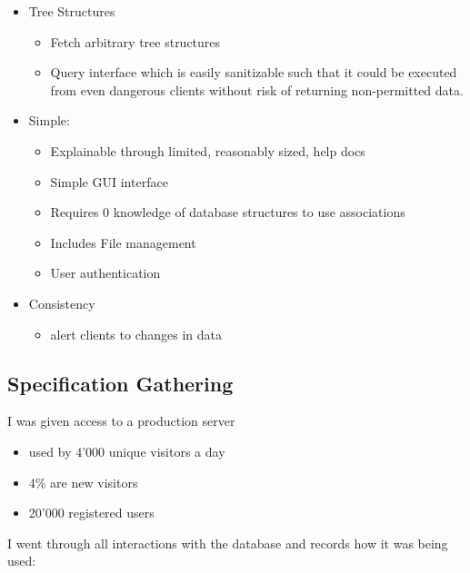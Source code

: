 \documentclass[
  12pt,
]{article}
\providecommand{\tightlist}{%
  \setlength{\itemsep}{0pt}\setlength{\parskip}{0pt}}
\begin{document}
\begin{itemize}
\tightlist
\item
  Tree Structures

  \begin{itemize}
  \tightlist
  \item
    Fetch arbitrary tree structures
  \item
    Query interface which is easily sanitizable such that it could be
    executed from even dangerous clients without risk of returning
    non-permitted data.
  \end{itemize}
\item
  Simple:

  \begin{itemize}
  \tightlist
  \item
    Explainable through limited, reasonably sized, help docs
  \item
    Simple GUI interface
  \item
    Requires 0 knowledge of database structures to use associations
  \item
    Includes File management
  \item
    User authentication
  \end{itemize}
\item
  Consistency

  \begin{itemize}
  \tightlist
  \item
    alert clients to changes in data
  \end{itemize}
\end{itemize}

\hypertarget{specification-gathering}{%
\subsection{Specification Gathering}\label{specification-gathering}}

I was given access to a production server

\begin{itemize}
\tightlist
\item
  used by 4'000 unique visitors a day
\item
  4\% are new visitors
\item
  20'000 registered users
\end{itemize}

I went through all interactions with the database and records how it was
being used:
\end{document}
